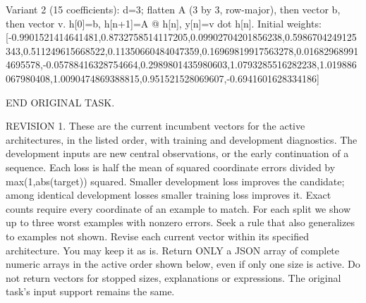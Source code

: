 Variant 2 (15 coefficients): d=3;\allowbreak{} flatten A (3 by 3,\allowbreak{} row-major),\allowbreak{} then vector b,\allowbreak{} then vector v. h[\allowbreak{}0]\allowbreak{}=b,\allowbreak{} h[\allowbreak{}n+1]\allowbreak{}=A @ h[\allowbreak{}n]\allowbreak{},\allowbreak{} y[\allowbreak{}n]\allowbreak{}=v dot h[\allowbreak{}n]\allowbreak{}. Initial weights: [\allowbreak{}-0.9901521414641481,\allowbreak{}0.8732758514117205,\allowbreak{}0.09902704201856238,\allowbreak{}0.5986704249125343,\allowbreak{}0.511249615668522,\allowbreak{}0.11350660484047359,\allowbreak{}0.16969819917563278,\allowbreak{}0.016829689914695578,\allowbreak{}-0.05788416328754664,\allowbreak{}0.2989801435980603,\allowbreak{}1.0793285516282238,\allowbreak{}1.019886067980408,\allowbreak{}1.0090474869388815,\allowbreak{}0.951521528069607,\allowbreak{}-0.6941601628334186]\allowbreak{}\par
\par
END ORIGINAL TASK.\par
REVISION 1. These are the current incumbent vectors for the active architectures,\allowbreak{} in the listed order,\allowbreak{} with training and development diagnostics. The development inputs are new central observations,\allowbreak{} or the early continuation of a sequence. Each loss is half the mean of squared coordinate errors divided by max(1,\allowbreak{}abs(target)) squared. Smaller development loss improves the candidate;\allowbreak{} among identical development losses smaller training loss improves it. Exact counts require every coordinate of an example to match. For each split we show up to three worst examples with nonzero errors. Seek a rule that also generalizes to examples not shown. Revise each current vector within its specified architecture. You may keep it as is. Return ONLY a JSON array of complete numeric arrays in the active order shown below,\allowbreak{} even if only one size is active. Do not return vectors for stopped sizes,\allowbreak{} explanations or expressions. The original task's input support remains the same.\par
